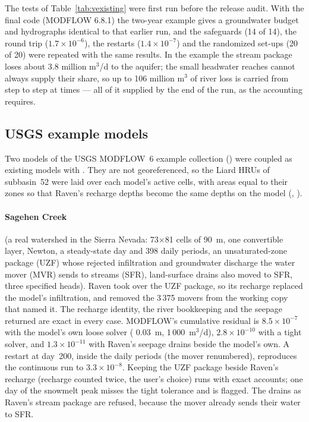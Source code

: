 The tests of Table~\ref{tab:vexisting} were first run before the release audit. With the final code (MODFLOW 6.8.1) the
two-year example gives a groundwater budget and hydrographs identical to that earlier run, and the safeguards (14 of 14), the
round trip ($1.7\times10^{-6}$), the restarts ($1.4\times10^{-7}$) and the randomized set-ups (20 of 20) were repeated with the
same results. In the example the stream package loses about 3.8 million m$^3$/d to the aquifer; the small headwater reaches
cannot always supply their share, so up to 106 million m$^3$ of river loss is carried from step to step at times --- all of it
supplied by the end of the run, as the accounting requires.

\subsection{USGS example models}\label{sec:usgs}
Two models of the USGS MODFLOW~6 example collection () were coupled as existing models with
. They are not georeferenced, so the Liard HRUs of subbasin~52 were laid over each model's active cells,
with  areas equal to their zones so that Raven's recharge depths become the same depths on the model
(, ).

\paragraph{Sagehen Creek} (a real watershed in the Sierra Nevada: 73$\times$81 cells of 90~m, one convertible layer,
Newton, a steady-state day and 398 daily periods, an unsaturated-zone package (UZF) whose rejected infiltration and
groundwater discharge the water mover (MVR) sends to streams (SFR), land-surface drains also moved to SFR, three specified
heads). Raven took over the UZF package, so its recharge replaced the model's infiltration, and removed the 3\,375 movers
from the working copy that named it. The recharge identity, the river bookkeeping and the seepage returned are exact in every
case. MODFLOW's cumulative residual is $8.5\times10^{-7}$ with the model's own loose solver ( 0.03~m,
 1\,000~m$^3$/d), $2.8\times10^{-10}$ with a tight solver, and $1.3\times10^{-11}$ with Raven's seepage
drains beside the model's own. A restart at day~200, inside the daily periods (the mover renumbered), reproduces the
continuous run to $3.3\times10^{-8}$. Keeping the UZF package beside Raven's recharge (recharge counted twice, the user's
choice) runs with exact accounts; one day of the snowmelt peak misses the tight tolerance and is flagged. The drains as
Raven's stream package are refused, because the mover already sends their water to SFR.

